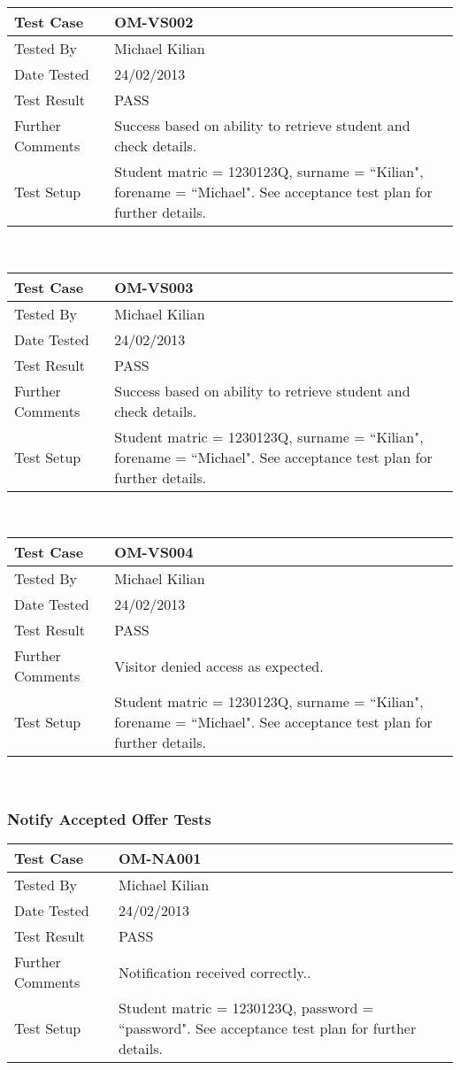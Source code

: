 \documentclass{l3deliverable}
\begin{document}
\begin{tabular}{lp{10cm}}
\hline 
\textbf{Test Case} & OM-VS002\tabularnewline
\hline 
\hline 
Tested By & Michael Kilian\tabularnewline
\hline 
Date Tested & 24/02/2013\tabularnewline
\hline 
Test Result & PASS\tabularnewline
\hline
Further Comments & Success based on ability to retrieve student and check details. \tabularnewline
\hline
Test Setup & Student matric = 1230123Q, surname = ``Kilian", forename = ``Michael". See acceptance test plan for further details.\tabularnewline
\hline
\end{tabular}\\

\begin{tabular}{lp{10cm}}
\hline 
\textbf{Test Case} & OM-VS003\tabularnewline
\hline 
\hline 
Tested By & Michael Kilian\tabularnewline
\hline 
Date Tested & 24/02/2013\tabularnewline
\hline 
Test Result & PASS\tabularnewline
\hline
Further Comments & Success based on ability to retrieve student and check details. \tabularnewline
\hline
Test Setup & Student matric = 1230123Q, surname = ``Kilian", forename = ``Michael". See acceptance test plan for further details.\tabularnewline
\hline
\end{tabular}\\

\begin{tabular}{lp{10cm}}
\hline 
\textbf{Test Case} & OM-VS004\tabularnewline
\hline 
\hline 
Tested By & Michael Kilian\tabularnewline
\hline 
Date Tested & 24/02/2013\tabularnewline
\hline 
Test Result & PASS\tabularnewline
\hline
Further Comments & Visitor denied access as expected. \tabularnewline
\hline
Test Setup & Student matric = 1230123Q, surname = ``Kilian", forename = ``Michael". See acceptance test plan for further details.\tabularnewline
\hline
\end{tabular}\\

\subsubsection{Notify Accepted Offer Tests}
\begin{tabular}{lp{10cm}}
\hline 
\textbf{Test Case} & OM-NA001\tabularnewline
\hline 
\hline 
Tested By & Michael Kilian\tabularnewline
\hline 
Date Tested & 24/02/2013\tabularnewline
\hline 
Test Result & PASS\tabularnewline
\hline
Further Comments & Notification received correctly.. \tabularnewline
\hline
Test Setup & Student matric = 1230123Q, password = ``password". See acceptance test plan for further details.\tabularnewline
\hline
\end{tabular}\\
\end{document}
